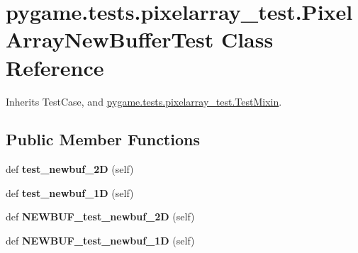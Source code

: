 \hypertarget{classpygame_1_1tests_1_1pixelarray__test_1_1_pixel_array_new_buffer_test}{}\section{pygame.\+tests.\+pixelarray\+\_\+test.\+Pixel\+Array\+New\+Buffer\+Test Class Reference}
\label{classpygame_1_1tests_1_1pixelarray__test_1_1_pixel_array_new_buffer_test}


Inherits Test\+Case, and \hyperlink{classpygame_1_1tests_1_1pixelarray__test_1_1_test_mixin}{pygame.\+tests.\+pixelarray\+\_\+test.\+Test\+Mixin}.

\subsection*{Public Member Functions}
\begin{DoxyCompactItemize}
\item 
\mbox{\label{classpygame_1_1tests_1_1pixelarray__test_1_1_pixel_array_new_buffer_test_ac6cc3fae4fd3eef79dc9d2c2bf3670e7}} 
def {\bfseries test\+\_\+newbuf\+\_\+2D} (self)
\item 
\mbox{\label{classpygame_1_1tests_1_1pixelarray__test_1_1_pixel_array_new_buffer_test_a5775a891a166cecb59a693603ea0d3d9}} 
def {\bfseries test\+\_\+newbuf\+\_\+1D} (self)
\item 
\mbox{\label{classpygame_1_1tests_1_1pixelarray__test_1_1_pixel_array_new_buffer_test_ab5f1e9160bbf034197fd554d4c2e27be}} 
def {\bfseries N\+E\+W\+B\+U\+F\+\_\+test\+\_\+newbuf\+\_\+2D} (self)
\item 
\mbox{\label{classpygame_1_1tests_1_1pixelarray__test_1_1_pixel_array_new_buffer_test_ab449bf28f8e6987b189f1b4d12787a30}} 
def {\bfseries N\+E\+W\+B\+U\+F\+\_\+test\+\_\+newbuf\+\_\+1D} (self)
\end{DoxyCompactItemize}
